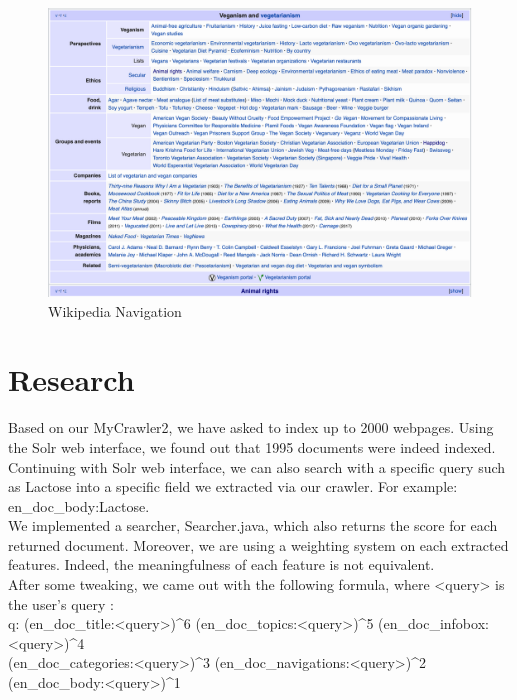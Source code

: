 \documentclass[a4paper]{article}
\begin{document}
\begin{figure}[H]
	\includegraphics[scale=0.5]{imgs/navigation}
	\caption{Wikipedia Navigation}
	\label{fig:navigation}
\end{figure}

\section{Research}
Based on our MyCrawler2, we have asked to index up to 2000 webpages. Using the Solr web interface, we found out that 1995 documents were indeed indexed.\\

Continuing with Solr web interface, we can also search with a specific query such as Lactose into a specific field we extracted via our crawler. For example: en\_doc\_body:Lactose. \\

We implemented a searcher, Searcher.java, which also returns the score for each returned document. Moreover, we are using a weighting system on each extracted features. Indeed, the meaningfulness of each feature is not equivalent. \\

After some tweaking, we came out with the following formula, where <query> is the user's query :\\

q: (en\_doc\_title:<query>)\^{}6 (en\_doc\_topics:<query>)\^{}5 (en\_doc\_infobox:<query>)\^{}4\\
(en\_doc\_categories:<query>)\^{}3 (en\_doc\_navigations:<query>)\^{}2 (en\_doc\_body:<query>)\^{}1\\
\end{document}
